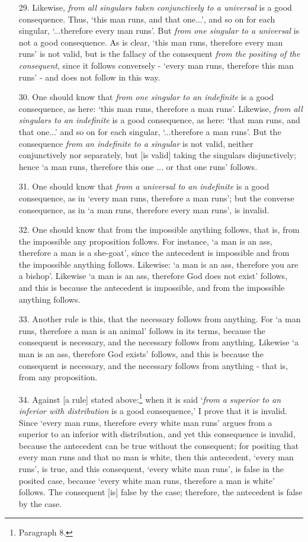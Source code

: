 \documentclass[]{article}
\begin{document}
\begin{enumerate}
\item[29.] Likewise, \textit{from all singulars taken conjunctively to a universal} is a good consequence. Thus, `this man runs, and that one...', and so on for each singular, `...therefore every man runs'. But \textit{from one singular to a universal} is not a good consequence. As is clear, `this man runs, therefore every man runs' is not valid, but is the fallacy of the consequent \textit{from the positing of the consequent}, since it follows conversely - `every man runs, therefore this man runs' - and does not follow in this way.
\item[30.] One should know that \textit{from one singular to an indefinite} is a good consequence, as here: `this man runs, therefore a man runs'. Likewise, \textit{from all singulars to an indefinite} is a good consequence, as here: `that man runs, and that one...' and so on for each singular, `...therefore a man runs'. But the consequence \textit{from an indefinite to a singular} is not valid, neither conjunctively nor separately, but [is valid] taking the singulars disjunctively; hence `a man runs, therefore this one ... or that one runs' follows.
\item[31.] One should know that \textit{from a universal to an indefinite} is a good consequence, as in `every man runs, therefore a man runs'; but the converse consequence, as in `a man runs, therefore every man runs', is invalid.
\item[32.] One should know that from the impossible anything follows, that is, from the impossible any proposition follows. For instance, `a man is an ass, therefore a man is a she-goat', since the antecedent is impossible and from the impossible anything follows. Likewise: `a man is an ass, therefore you are a bishop'. Likewise `a man is an ass, therefore God does not exist' follows, and this is because the antecedent is impossible, and from the impossible anything follows. 
\item[33.] Another rule is this, that the necessary follows from anything. For `a man runs, therefore a man is an animal' follows in its terms, because the consequent is necessary, and the necessary follows from anything. Likewise `a man is an ass, therefore God exists' follows, and this is because the consequent is necessary, and the necessary follows from anything - that is, from any proposition.
\item[34.] Against [a rule] stated above:\footnote{Paragraph 8.} when it is said `\textit{from a superior to an inferior with distribution} is a good consequence,' I prove that it is invalid. Since `every man runs, therefore every white man runs' argues from a superior to an inferior with distribution, and yet this consequence is invalid, because the antecedent can be true without the consequent; for positing that every man runs and that no man is white, then this antecedent, `every man runs', is true, and this consequent, `every white man runs', is false in the posited case, because `every white man runs, therefore a man is white' follows. The consequent [is] false by the case; therefore, the antecedent is false by the case. 

\end{enumerate}
\end{document}

